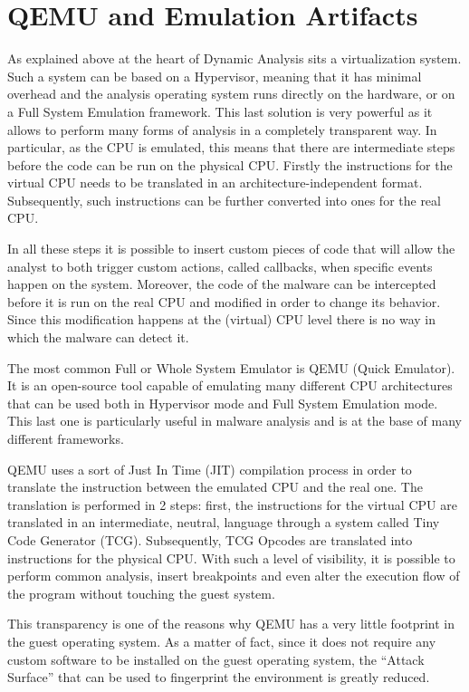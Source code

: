 \section{QEMU and Emulation Artifacts}

As explained above at the heart of Dynamic Analysis sits a virtualization system. Such a system can be based on a Hypervisor, meaning that it has minimal overhead and the analysis operating system runs directly on the hardware, or on a Full System Emulation framework. This last solution is very powerful as it allows to perform many forms of analysis in a completely transparent way. In particular, as the CPU is emulated, this means that there are intermediate steps before the code can be run on the physical CPU. Firstly the instructions for the virtual CPU needs to be translated in an architecture-independent format. Subsequently, such instructions can be further converted into ones for the real CPU. 

In all these steps it is possible to insert custom pieces of code that will allow the analyst to both trigger custom actions, called callbacks, when specific events happen on the system. Moreover, the code of the malware can be intercepted before it is run on the real CPU and modified in order to change its behavior. Since this modification happens at the (virtual) CPU level there is no way in which the malware can detect it.

The most common Full or Whole System Emulator is QEMU (Quick Emulator). It is an open-source tool capable of emulating many different CPU architectures that can be used both in Hypervisor mode and Full System Emulation mode. This last one is particularly useful in malware analysis and is at the base of many different frameworks.  

QEMU uses a sort of Just In Time (JIT) compilation process in order to translate the instruction between the emulated CPU and the real one. The translation is performed in 2 steps: first, the instructions for the virtual CPU are translated in an intermediate, neutral, language through a system called Tiny Code Generator (TCG). Subsequently, TCG Opcodes are translated into instructions for the physical CPU. With such a level of visibility, it is possible to perform common analysis, insert breakpoints and even alter the execution flow of the program without touching the guest system. 

This transparency is one of the reasons why QEMU has a very little footprint in the guest operating system. As a matter of fact, since it does not require any custom software to be installed on the guest operating system, the ``Attack Surface'' that can be used to fingerprint the environment is greatly reduced. 


